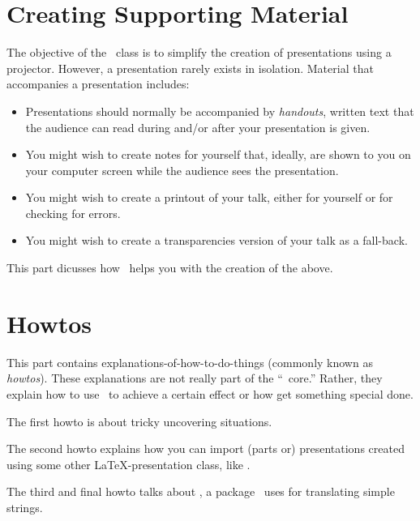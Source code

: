 \documentclass{ltxdoc}
\begin{document}
\part{Creating Supporting Material}

The objective of the \beamer\ class is to simplify the creation of presentations using a projector. However, a presentation rarely exists in isolation. Material that accompanies a presentation includes:
\begin{itemize}
\item
  Presentations should normally be accompanied by \emph{handouts}, written text that the audience can read during and/or after your presentation is given.
\item
  You might wish to create notes for yourself that, ideally, are shown to you on your computer screen while the audience sees the presentation.
\item
  You might wish to create a printout of your talk, either for yourself or for checking for errors.
\item
  You might wish to create a transparencies version of your talk as a fall-back.
\end{itemize}

This part dicusses how \beamer\ helps you with the creation of the above.








\part{Howtos}

This part contains explanations-of-how-to-do-things (commonly known as \emph{howtos}). These explanations are not really part of the ``\beamer\ core.'' Rather, they explain how to use \beamer\ to achieve a certain effect or how get something special done.

The first howto is about tricky uncovering situations.

The second howto explains how you can import (parts or) presentations created using some other \LaTeX-presentation class, like \prosper.

The third and final howto talks about \translatorname, a package \beamer\ uses for translating simple strings.





\printindex
\end{document}

